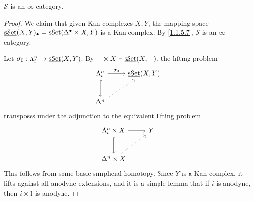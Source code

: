 \begin{proposition}\label{1.2.16.2}
	$\mathcal{S} $ is an $\infty $-category.
\end{proposition}
\begin{proof}
	We claim that given Kan complexes $X,Y$, the mapping space $\underline{\mathrm{s}\mathcal{S}\mathrm{et} } (X,Y)_{\bullet} =\mathrm{s}\mathcal{S}\mathrm{et} (\Delta ^{\bullet} \times X,Y)$ is a Kan complex. By \cref{1.1.5.7}, $\mathcal{S} $ is an $\infty $-category.

	Let $\sigma _0 : \Lambda_i^n \to \underline{\mathrm{s}\mathcal{S}\mathrm{et} } (X,Y)$. By $-\times X \dashv \underline{\mathrm{s}\mathcal{S}\mathrm{et} } (X,-)$, the lifting problem
	\[\begin{tikzcd}[row sep = 2.5em, column sep = 2.5em]
	\Lambda _i^n \ar[" \sigma _0 ", r] \ar[hook, d]  & \underline{\sSet } (X,Y)\\
	\Delta ^n \ar[dotted, ur]  & 
	\end{tikzcd}\]
	transposes under the adjunction to the equivalent lifting problem
	\[\begin{tikzcd}[row sep = 2.5em, column sep = 2.5em]
	\Lambda _i^n \times X \ar[r] \ar[hook, d]  & Y \\
	\Delta ^n \times X \ar[dotted, ur]  & 
	\end{tikzcd}\]
	This follows from some basic simplicial homotopy. Since $Y$ is a Kan complex, it lifts against all anodyne extensions, and it is a simple lemma that if $i$ is anodyne, then $i\times 1$ is anodyne.
\end{proof}

